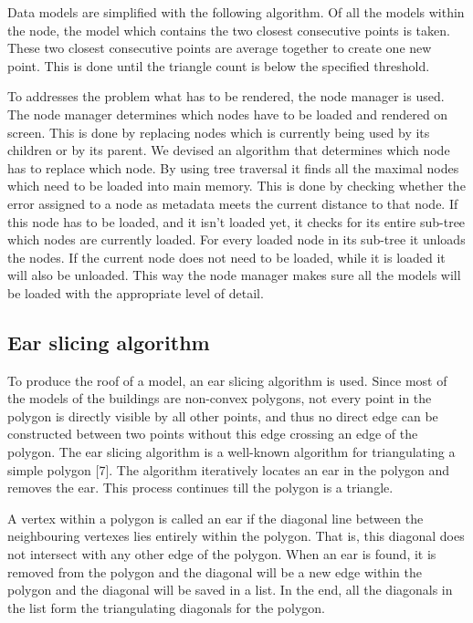 Data models are simplified with the following algorithm. Of all the models within the node, the model which contains the two closest consecutive points is taken. These two closest consecutive points are average together to create one new point. This is done until the triangle count is below the specified threshold.

To addresses the problem what has to be rendered, the node manager is used. The node manager determines which nodes have to be loaded and rendered on screen. This is done by replacing nodes which is currently being used by its children or by its parent. We devised an algorithm that determines which node has to replace which node. By using tree traversal it finds all the maximal nodes which need to be loaded into main memory. This is done by checking whether the error assigned to a node as metadata meets the current distance to that node. If this node has to be loaded, and it isn’t loaded yet, it checks for its entire sub-tree which nodes are currently loaded. For every loaded node in its sub-tree it unloads the nodes. If the current node does not need to be loaded, while it is loaded it will also be unloaded. This way the node manager makes sure all the models will be loaded with the appropriate level of detail.

\subsection{Ear slicing algorithm}
To produce the roof of a model, an ear slicing algorithm is used. Since most of the models of the buildings are non-convex polygons, not every point in the polygon is directly visible by all other points, and thus no direct edge can be constructed between two points without this edge crossing an edge of the polygon. The ear slicing algorithm is a well-known algorithm for triangulating a simple polygon [7]. The algorithm iteratively locates an ear in the polygon and removes the ear. This process continues till the polygon is a triangle.

A vertex within a polygon is called an ear if the diagonal line between the neighbouring vertexes lies entirely within the polygon. That is, this diagonal does not intersect with any other edge of the polygon. When an ear is found, it is removed from the polygon and the diagonal will be a new edge within the polygon and the diagonal will be saved in a list. In the end, all the diagonals in the list form the triangulating diagonals for the polygon.

